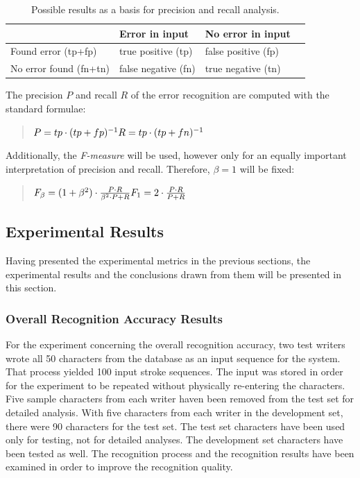 \begin{table}[htbp]
\begin{center}
  \begin{tabular}{|l|l|l|p{200pt}|}
    \hline
                           & Error in input      & No error in input \\
    \hline
    Found error (tp+fp)    & true positive (tp)  & false positive (fp) \\
    \hline
    No error found (fn+tn) & false negative (fn) & true negative (tn) \\
    \hline
  \end{tabular}
\end{center}
\caption{Possible results as a basis for precision and recall analysis.}
\label{table:eval:resultsforprecisionandrecall}
\end{table}
The precision \(P\) and recall \(R\) of the error recognition are computed 
with the standard formulae:
\begin{quote}
\(
P=tp \cdot (tp+fp)^{-1} \\
R=tp \cdot (tp+fn)^{-1} \\
\)  
\end{quote}
Additionally, the \emph{F-measure} will be used, however only for an equally 
important interpretation of precision and recall. Therefore, \(\beta = 1\) will
be fixed:
\begin{quote}
\(
F_{\beta} = (1 + \beta^2) \cdot \frac{P \cdot R }{ \beta^2 \cdot P + R} \\
F_{1} = 2 \cdot \frac{P \cdot R }{P + R} \\
\)
\end{quote}

\subsection{Experimental Results}
\label{sec:eval:experimentalresults}

Having presented the experimental metrics in the previous sections, 
the experimental results and the conclusions drawn from them will be 
presented in this section.

\subsubsection{Overall Recognition Accuracy Results}
\label{sec:eval:resultsoverallrecognition}

For the experiment concerning the overall recognition accuracy, two test writers 
wrote all 50 characters from the database as an input sequence for the system.
That process yielded 100 input stroke sequences.
The input was stored in order for the experiment to be repeated without
physically re-entering the characters. Five sample characters from each 
writer haven been removed from the test set for detailed analysis.
With five characters from each writer in the development set, there were 
90 characters for the test set.
The test set characters have been used only for testing, not for 
detailed analyses. The development set characters have been tested as well.
The recognition process and the recognition results have been 
examined in order to improve the recognition quality.

